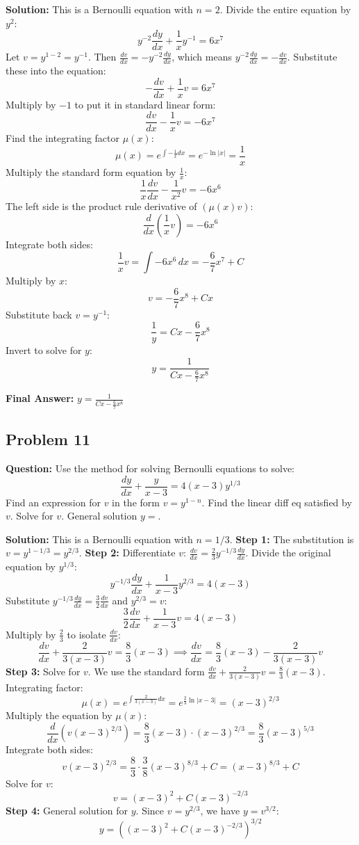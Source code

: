 \documentclass[11pt]{article}
\begin{document}
\textbf{Solution:}
This is a Bernoulli equation with $n=2$. Divide the entire equation by $y^2$:
\[ y^{-2}\frac{dy}{dx} + \frac{1}{x}y^{-1} = 6x^7 \]
Let $v = y^{1-2} = y^{-1}$. Then $\frac{dv}{dx} = -y^{-2}\frac{dy}{dx}$, which means $y^{-2}\frac{dy}{dx} = -\frac{dv}{dx}$.
Substitute these into the equation:
\[ -\frac{dv}{dx} + \frac{1}{x}v = 6x^7 \]
Multiply by $-1$ to put it in standard linear form:
\[ \frac{dv}{dx} - \frac{1}{x}v = -6x^7 \]
Find the integrating factor $\mu(x)$:
\[ \mu(x) = e^{\int -\frac{1}{x} dx} = e^{-\ln|x|} = \frac{1}{x} \]
Multiply the standard form equation by $\frac{1}{x}$:
\[ \frac{1}{x}\frac{dv}{dx} - \frac{1}{x^2}v = -6x^6 \]
The left side is the product rule derivative of $(\mu(x) v)$:
\[ \frac{d}{dx}\left(\frac{1}{x}v\right) = -6x^6 \]
Integrate both sides:
\[ \frac{1}{x}v = \int -6x^6 \, dx = -\frac{6}{7}x^7 + C \]
Multiply by $x$:
\[ v = -\frac{6}{7}x^8 + Cx \]
Substitute back $v = y^{-1}$:
\[ \frac{1}{y} = Cx - \frac{6}{7}x^8 \]
Invert to solve for $y$:
\[ y = \frac{1}{Cx - \frac{6}{7}x^8} \]

\textbf{Final Answer:} $y = \frac{1}{Cx - \frac{6}{7}x^8}$

\vspace{0.5cm}
\subsection*{Problem 11}
\textbf{Question:} Use the method for solving Bernoulli equations to solve:
\[ \frac{dy}{dx} + \frac{y}{x-3} = 4(x-3)y^{1/3} \]
Find an expression for $v$ in the form $v = y^{1-n}$. Find the linear diff eq satisfied by $v$. Solve for $v$. General solution $y=$.

\textbf{Solution:}
This is a Bernoulli equation with $n=1/3$.
\textbf{Step 1:} The substitution is $v = y^{1 - 1/3} = y^{2/3}$.
\textbf{Step 2:} Differentiate $v$: $\frac{dv}{dx} = \frac{2}{3}y^{-1/3}\frac{dy}{dx}$.
Divide the original equation by $y^{1/3}$:
\[ y^{-1/3}\frac{dy}{dx} + \frac{1}{x-3}y^{2/3} = 4(x-3) \]
Substitute $y^{-1/3}\frac{dy}{dx} = \frac{3}{2}\frac{dv}{dx}$ and $y^{2/3} = v$:
\[ \frac{3}{2}\frac{dv}{dx} + \frac{1}{x-3}v = 4(x-3) \]
Multiply by $\frac{2}{3}$ to isolate $\frac{dv}{dx}$:
\[ \frac{dv}{dx} + \frac{2}{3(x-3)}v = \frac{8}{3}(x-3) \implies \frac{dv}{dx} = \frac{8}{3}(x-3) - \frac{2}{3(x-3)}v \]
\textbf{Step 3:} Solve for $v$. We use the standard form $\frac{dv}{dx} + \frac{2}{3(x-3)}v = \frac{8}{3}(x-3)$.
Integrating factor:
\[ \mu(x) = e^{\int \frac{2}{3(x-3)} dx} = e^{\frac{2}{3}\ln|x-3|} = (x-3)^{2/3} \]
Multiply the equation by $\mu(x)$:
\[ \frac{d}{dx}\left(v(x-3)^{2/3}\right) = \frac{8}{3}(x-3) \cdot (x-3)^{2/3} = \frac{8}{3}(x-3)^{5/3} \]
Integrate both sides:
\[ v(x-3)^{2/3} = \frac{8}{3} \cdot \frac{3}{8} (x-3)^{8/3} + C = (x-3)^{8/3} + C \]
Solve for $v$:
\[ v = (x-3)^2 + C(x-3)^{-2/3} \]
\textbf{Step 4:} General solution for $y$. Since $v = y^{2/3}$, we have $y = v^{3/2}$:
\[ y = \left((x-3)^2 + C(x-3)^{-2/3}\right)^{3/2} \]
\end{document}
